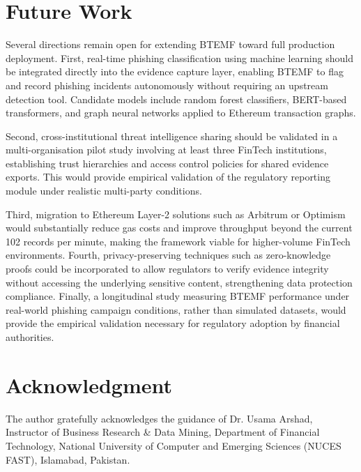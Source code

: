 \documentclass[conference]{IEEEtran}
\begin{document}
\section{Future Work}
 
Several directions remain open for extending BTEMF toward full production deployment. First, real-time phishing classification using machine learning should be integrated directly into the evidence capture layer, enabling BTEMF to flag and record phishing incidents autonomously without requiring an upstream detection tool. Candidate models include random forest classifiers, BERT-based transformers, and graph neural networks applied to Ethereum transaction graphs.
 
Second, cross-institutional threat intelligence sharing should be validated in a multi-organisation pilot study involving at least three FinTech institutions, establishing trust hierarchies and access control policies for shared evidence exports. This would provide empirical validation of the regulatory reporting module under realistic multi-party conditions.
 
Third, migration to Ethereum Layer-2 solutions such as Arbitrum or Optimism would substantially reduce gas costs and improve throughput beyond the current 102 records per minute, making the framework viable for higher-volume FinTech environments. Fourth, privacy-preserving techniques such as zero-knowledge proofs could be incorporated to allow regulators to verify evidence integrity without accessing the underlying sensitive content, strengthening data protection compliance. Finally, a longitudinal study measuring BTEMF performance under real-world phishing campaign conditions, rather than simulated datasets, would provide the empirical validation necessary for regulatory adoption by financial authorities.

\section*{Acknowledgment}
The author gratefully acknowledges the guidance of Dr. Usama Arshad, Instructor of Business Research \& Data Mining, Department of Financial Technology, National University of Computer and Emerging Sciences (NUCES FAST), Islamabad, Pakistan.
\end{document}

